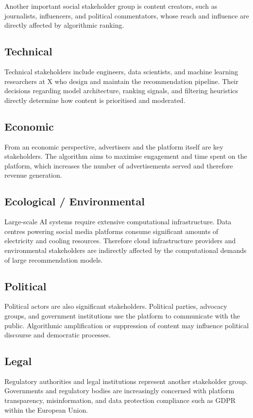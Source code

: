 \documentclass[]
{UCD_CS_41820_Report}
\begin{document}
Another important social stakeholder group is content creators, such as journalists, influencers, 
and political commentators, whose reach and influence are directly affected by algorithmic ranking.

\subsection{Technical}
Technical stakeholders include engineers, data scientists, and machine learning researchers at X 
who design and maintain the recommendation pipeline. Their decisions regarding model architecture, 
ranking signals, and filtering heuristics directly determine how content is prioritised and moderated.

\subsection{Economic}
From an economic perspective, advertisers and the platform itself are key stakeholders. The algorithm 
aims to maximise engagement and time spent on the platform, which increases the number of advertisements served and therefore revenue generation.

\subsection{Ecological / Environmental}
Large-scale AI systems require extensive computational infrastructure. Data centres powering social 
media platforms consume significant amounts of electricity and cooling resources. Therefore cloud 
infrastructure providers and environmental stakeholders are indirectly affected by the computational 
demands of large recommendation models.

\subsection{Political}
Political actors are also significant stakeholders. Political parties, advocacy groups, and government 
institutions use the platform to communicate with the public. Algorithmic amplification or suppression 
of content may influence political discourse and democratic processes.

\subsection{Legal}
Regulatory authorities and legal institutions represent another stakeholder group. Governments and 
regulatory bodies are increasingly concerned with platform transparency, misinformation, and data 
protection compliance such as GDPR within the European Union.
\end{document}
